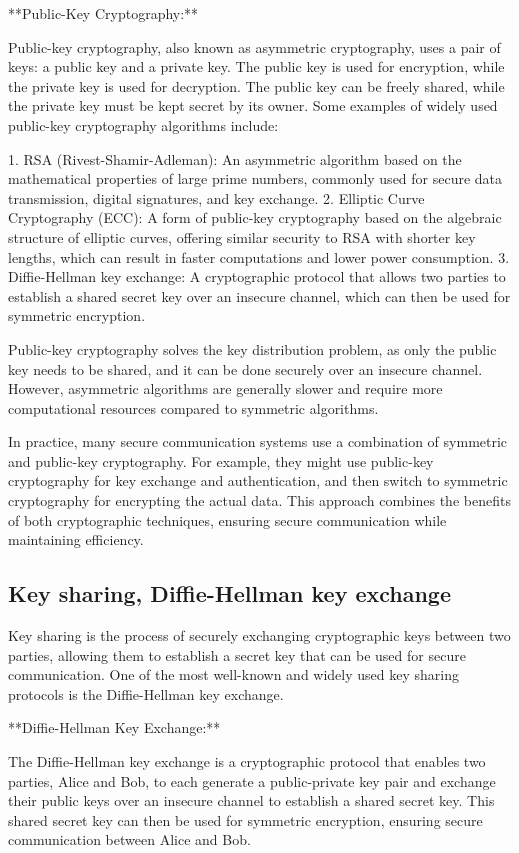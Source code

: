 \documentclass{article}
\begin{document}
**Public-Key Cryptography:**

Public-key cryptography, also known as asymmetric cryptography, uses a pair of keys: a public key and a private key. The public key is used for encryption, while the private key is used for decryption. The public key can be freely shared, while the private key must be kept secret by its owner. Some examples of widely used public-key cryptography algorithms include:

1. RSA (Rivest-Shamir-Adleman): An asymmetric algorithm based on the mathematical properties of large prime numbers, commonly used for secure data transmission, digital signatures, and key exchange.
2. Elliptic Curve Cryptography (ECC): A form of public-key cryptography based on the algebraic structure of elliptic curves, offering similar security to RSA with shorter key lengths, which can result in faster computations and lower power consumption.
3. Diffie-Hellman key exchange: A cryptographic protocol that allows two parties to establish a shared secret key over an insecure channel, which can then be used for symmetric encryption.

Public-key cryptography solves the key distribution problem, as only the public key needs to be shared, and it can be done securely over an insecure channel. However, asymmetric algorithms are generally slower and require more computational resources compared to symmetric algorithms.

In practice, many secure communication systems use a combination of symmetric and public-key cryptography. For example, they might use public-key cryptography for key exchange and authentication, and then switch to symmetric cryptography for encrypting the actual data. This approach combines the benefits of both cryptographic techniques, ensuring secure communication while maintaining efficiency.


\subsection{Key sharing, Diffie-Hellman key exchange}

Key sharing is the process of securely exchanging cryptographic keys between two parties, allowing them to establish a secret key that can be used for secure communication. One of the most well-known and widely used key sharing protocols is the Diffie-Hellman key exchange.

**Diffie-Hellman Key Exchange:**

The Diffie-Hellman key exchange is a cryptographic protocol that enables two parties, Alice and Bob, to each generate a public-private key pair and exchange their public keys over an insecure channel to establish a shared secret key. This shared secret key can then be used for symmetric encryption, ensuring secure communication between Alice and Bob.
\end{document}
